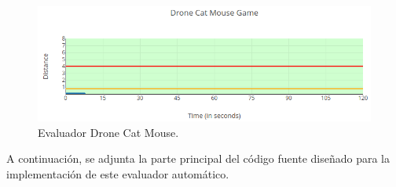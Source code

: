 \documentclass[a4paper, 12pt]{book}
\begin{document}
\begin{figure}[H]
	\centering
    \includegraphics[width=16cm]{img/evaluator_drone_cat_mouse.png}
    \caption{Evaluador Drone Cat Mouse.}
    \label{figura:evaluator_drone}
\end{figure}

A continuación, se adjunta la parte principal del código fuente diseñado para la implementación de este evaluador automático.
\end{document}
